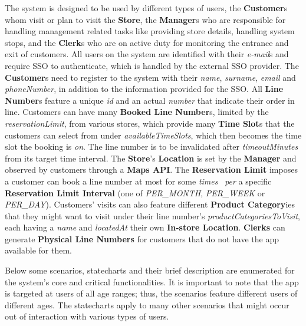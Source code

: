 The system is designed to be used by different types of users, the \textbf{Customer}s whom visit or plan to visit the \textbf{Store}, the \textbf{Manager}s who are responsible for handling management related tasks like providing store details, handling system stops, and the \textbf{Clerk}s who are on active duty for monitoring the entrance and exit of customers.
All users on the system are identified with their \textit{e-mail}s and require SSO to authenticate, which is handled by the external SSO provider.
The \textbf{Customer}s need to register to the system with their \textit{name}, \textit{surname}, \textit{email} and \textit{phoneNumber}, in addition to the information provided for the SSO.
All \textbf{Line Number}s feature a unique \textit{id} and an actual \textit{number} that indicate their order in line.
Customers can have many \textbf{Booked Line Number}s, limited by the \textit{reservationLimit}, from various stores, which provide many \textbf{Time Slot}s that the customers can select from under \textit{availableTimeSlots}, which then becomes the time slot the booking is \textit{on}.
The line number is to be invalidated after \textit{timeoutMinutes} from its target time interval.
The \textbf{Store}'s \textbf{Location} is set by the \textbf{Manager} and observed by customers through a \textbf{Maps API}.
The \textbf{Reservation Limit} imposes a customer can book a line number at most for some \textit{times} \ \textit{per} a specific \textbf{Reservation Limit Interval} (one of \textit{PER\_MONTH}, \textit{PER\_WEEK} or \textit{PER\_DAY}).
Customers' visits can also feature different \textbf{Product Category}ies that they might want to visit under their line number's \textit{productCategoriesToVisit}, each having a \textit{name} and \textit{locatedAt} their own \textbf{In-store Location}.
\textbf{Clerks} can generate \textbf{Physical Line Numbers} for customers that do not have the app available for them.

Below some scenarios, statecharts and their brief description are enumerated for the system's core and critical functionalities.
It is important to note that the app is targeted at users of all age ranges; thus, the scenarios feature different users of different ages.
The statecharts apply to many other scenarios that might occur out of interaction with various types of users.


